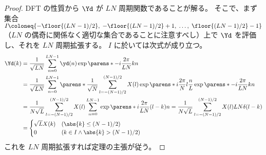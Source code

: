             \begin{proof}
                \quad\par
                DFT の性質から $\Yd$ が $LN$ 周期関数であることが解る。
                そこで、まず集合 $I\coloneq\{-\floor{(LN-1)/2},\;-\floor{(LN-1)/2}+1,\;\dots,\;\floor{(LN-1)/2}-1\}$ （$LN$ の偶奇に関係なく適切な集合であることに注意すべし）上で $\Yd$ を評価し、それを $LN$ 周期拡張する。
                $I$ に於いては次式が成り立つ。
                \begin{align*}
                    \Yd(k) &= \frac{1}{\sqrt{LN}}\sum_{n=0}^{LN-1}\yd(n)\exp\parens*{-i\frac{2\pi}{LN}kn} \\
                    &= \frac{1}{\sqrt{LN}}\sum_{n=0}^{LN-1}\parens*{\frac{1}{\sqrt{N}}\sum_{l=-(N-1)/2}^{(N-1)/2}X(l)\exp\parens*{i\frac{2\pi}{N}l\frac{n}{L}}}\exp\parens*{-i\frac{2\pi}{LN}kn} \\
                    &= \frac{1}{N\sqrt{L}}\sum_{l=-(N-1)/2}^{(N-1)/2}X(l)\sum_{n=0}^{LN-1}\exp\parens*{i\frac{2\pi}{LN}(l-k)n} = \frac{1}{N\sqrt{L}}\sum_{l=-(N-1)/2}^{(N-1)/2}X(l)LN\delta(l-k) \\
                    &= \begin{cases}
                        \sqrt{L}X(k) & (\abs{k}\leq (N-1)/2) \\
                        0 & (k\in I\land\abs{k}>(N-1)/2)
                    \end{cases}
                \end{align*}
                これを $LN$ 周期拡張すれば定理の主張が従う。
            \end{proof}
